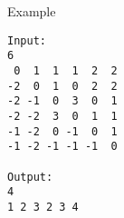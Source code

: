 Example
\begin{verbatim}
Input:
6
 0  1  1  1  2  2
-2  0  1  0  2  2
-2 -1  0  3  0  1
-2 -2  3  0  1  1
-1 -2  0 -1  0  1
-1 -2 -1 -1 -1  0

Output:
4
1 2 3 2 3 4 
\end{verbatim}
